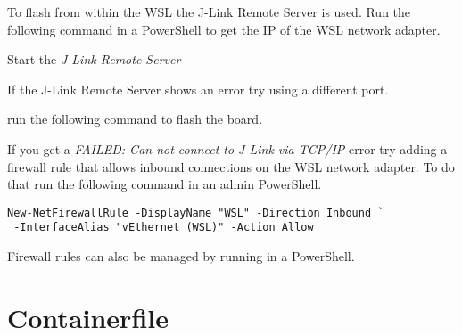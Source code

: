 To flash from within the WSL the J-Link Remote Server is used. Run the following
command in a PowerShell to get the IP of the WSL network adapter.


Start the \emph{J-Link Remote Server}

\begin{infobox}
  If the J-Link Remote Server shows an error try using a different port.
\end{infobox}

run the following command to flash the board.


\begin{infobox}
  If you get a \emph{FAILED: Can not connect to J-Link via TCP/IP} error try
  adding a firewall rule that allows inbound connections on the WSL network
  adapter. To do that run the following command in an admin PowerShell.

  \begin{lstlisting}
New-NetFirewallRule -DisplayName "WSL" -Direction Inbound `
 -InterfaceAlias "vEthernet (WSL)" -Action Allow
  \end{lstlisting}

  Firewall rules can also be managed by running  in a PowerShell.
\end{infobox}

\newpage

\fancyfoot{}

\appendix

\section{Containerfile}\label{containerfile}




